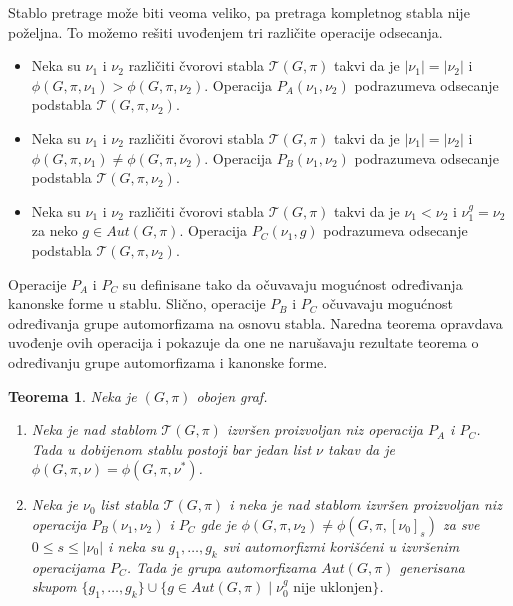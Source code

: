 \documentclass[12pt,oneside]{memoir}
\newtheorem{theorem}{Teorema}
\theoremstyle{definition}
\begin{document}
  Stablo pretrage može biti veoma veliko, pa pretraga kompletnog stabla nije
  poželjna. To možemo rešiti uvođenjem tri različite operacije odsecanja.
  \begin{itemize}
	  \item Neka su $\nu_1$ i $\nu_2$ različiti čvorovi stabla $\mathcal{T}(G,
		  \pi)$ takvi da je $|\nu_1|=|\nu_2|$ i $\phi(G, \pi, \nu_1) >
		  \phi(G, \pi, \nu_2)$. Operacija $P_A(\nu_1, \nu_2)$ podrazumeva
		  odsecanje podstabla $\mathcal{T}(G, \pi, \nu_2)$.
	  \item Neka su $\nu_1$ i $\nu_2$ različiti čvorovi stabla $\mathcal{T}(G,
		  \pi)$ takvi da je $|\nu_1|=|\nu_2|$ i $\phi(G, \pi, \nu_1) \neq
		  \phi(G, \pi, \nu_2)$. Operacija $P_B(\nu_1, \nu_2)$ podrazumeva
		  odsecanje podstabla $\mathcal{T}(G, \pi, \nu_2)$.
	  \item Neka su $\nu_1$ i $\nu_2$ različiti čvorovi stabla $\mathcal{T}(G,
		  \pi)$ takvi da je $\nu_1 < \nu_2$ i $\nu_1^g=\nu_2$ za neko $g \in
		  Aut(G, \pi)$. Operacija $P_C(\nu_1, g)$ podrazumeva odsecanje
		  podstabla $\mathcal{T}(G, \pi, \nu_2)$.
  \end{itemize}

  Operacije $P_A$ i $P_C$ su definisane tako da očuvavaju mogućnost određivanja
  kanonske forme u stablu. Slično, operacije $P_B$ i $P_C$ očuvavaju mogućnost
  određivanja grupe automorfizama na osnovu stabla. Naredna teorema opravdava
  uvođenje ovih operacija i pokazuje da one ne narušavaju rezultate teorema o
  određivanju grupe automorfizama i kanonske forme.

  \begin{theorem}
	  Neka je $(G, \pi)$ obojen graf.
	  \begin{enumerate}
		  \item Neka je nad stablom $\mathcal{T}(G, \pi)$ izvršen proizvoljan
			  niz operacija $P_A$ i $P_C$. Tada u dobijenom stablu postoji bar
			  jedan list $\nu$ takav da je $\phi(G, \pi, \nu) = \phi(G, \pi,
			  \nu^*)$.
		  \item Neka je $\nu_0$ list stabla $\mathcal{T}(G, \pi)$ i neka je nad
			  stablom izvršen proizvoljan niz operacija $P_B(\nu_1, \nu_2)$ i
			  $P_C$ gde je $\phi(G, \pi, \nu_2) \neq \phi(G, \pi,
			  [\nu_0]_{s})$ za sve $0 \leq s \leq |\nu_0|$ i neka su $g_1,
			  \dots, g_k$ svi automorfizmi korišćeni u izvršenim operacijama
			  $P_C$.  Tada je grupa automorfizama $Aut(G, \pi)$ generisana
			  skupom $\{g_1, \dots, g_k\} \cup \{g \in Aut(G, \pi) \mid \nu_0^g
			  \text{ nije uklonjen}\}$.
	  \end{enumerate}
  \end{theorem}
\end{document}
